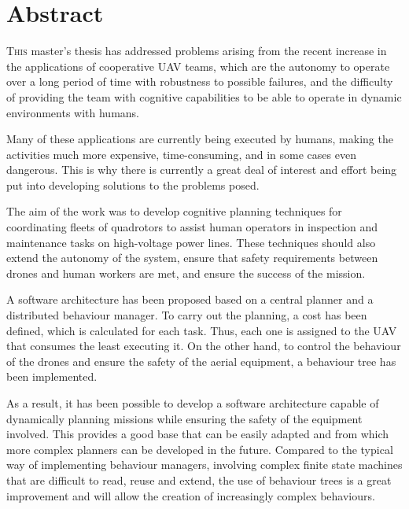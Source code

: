 \chapter*{Abstract}
\pagestyle{especial}
{}

\lettrine[lraise=-0.1, lines=2, loversize=0.2]{T}{his} master's thesis has addressed problems arising from the recent increase in the applications of cooperative \gls{UAV} teams, which are the autonomy to operate over a long period of time with robustness to possible failures, and the difficulty of providing the team with cognitive capabilities to be able to operate in dynamic environments with humans.

Many of these applications are currently being executed by humans, making the activities much more expensive, time-consuming, and in some cases even dangerous. This is why there is currently a great deal of interest and effort being put into developing solutions to the problems posed. 

The aim of the work was to develop cognitive planning techniques for coordinating fleets of quadrotors to assist human operators in inspection and maintenance tasks on high-voltage power lines. These techniques should also extend the autonomy of the system, ensure that safety requirements between drones and human workers are met, and ensure the success of the mission.

A software architecture has been proposed based on a central planner and a distributed behaviour manager. To carry out the planning, a cost has been defined, which is calculated for each task. Thus, each one is assigned to the \gls{UAV} that consumes the least executing it. On the other hand, to control the behaviour of the drones and ensure the safety of the aerial equipment, a behaviour tree has been implemented.

As a result, it has been possible to develop a software architecture capable of dynamically planning missions while ensuring the safety of the equipment involved. This provides a good base that can be easily adapted and from which more complex planners can be developed in the future. Compared to the typical way of implementing behaviour managers, involving complex finite state machines that are difficult to read, reuse and extend, the use of behaviour trees is a great improvement and will allow the creation of increasingly complex behaviours.

